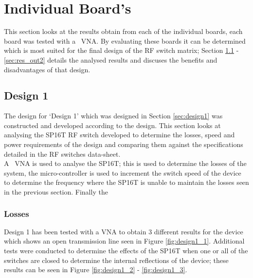 \documentclass[12pt,openany,a4paper]{book}
\begin{document}
\section{Individual Board's}	\label{sec:indv_boards}
This section looks at the results obtain from each of the individual boards, each board was tested with a \model \ VNA. By evaluating these boards it can be determined which is most suited for the final design of the RF switch matrix; Section \ref{sec:res_des1} - \ref{sec:res_out2} details the analysed results and discuses the benefits and disadvantages of that design. 


\subsection{Design 1}	\label{sec:res_des1}
The design for `Design 1' which was designed in Section \ref{sec:design1} was constructed and developed according to the design. This section looks at analysing the SP16T RF switch developed to determine the losses, speed and power requirements of the design and comparing them against the specifications detailed in the RF switches data-sheet.\\
A \model \ VNA is used to analyse the SP16T; this is used to determine the losses of the system, the micro-controller is used to increment the switch speed of the device to determine the frequency where the SP16T is unable to maintain the losses seen in the previous section. Finally the 
 
\subsubsection{Losses}
Design 1 has been tested with a VNA to obtain $3$ different results for the device which shows an open transmission line seen in Figure \ref{fig:design1_1}. Additional tests were conducted to determine the effects of the SP16T when one or all of the switches are closed to determine the internal reflections of the device; these results can be seen in Figure \ref{fig:design1_2} - \ref{fig:design1_3}.
\end{document}
